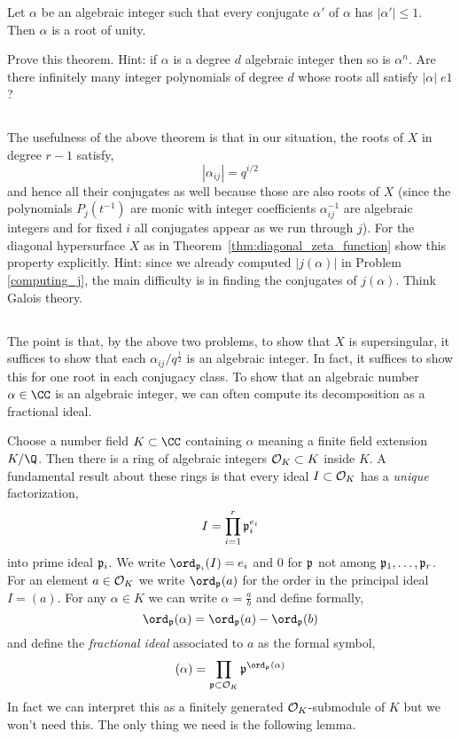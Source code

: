 \documentclass[12pt]{article}
\begin{document}
\begin{theorem}
Let $\alpha$ be an algebraic integer such that every conjugate $\alpha'$ of $\alpha$ has $|\alpha'| \le 1$. Then $\alpha$ is a root of unity.
\end{theorem}

Prove this theorem. Hint: if $\alpha$ is a degree $d$ algebraic integer then so is $\alpha^n$. Are there infinitely many integer polynomials of degree $d$ whose roots all satisfy $|\alpha| \;e 1$?

\subsection{}

The usefulness of the above theorem is that in our situation, the roots of $X$ in degree $r-1$ satisfy,
\[ |\alpha_{ij}| = q^{i/2} \]
and hence all their conjugates as well because those are also roots of $X$ (since the polynomials $P_j(t^{-1})$ are monic with integer coefficients $\alpha_{ij}^{-1}$ are algebraic integers and for fixed $i$ all conjugates appear as we run through $j$). For the diagonal hypersurface $X$ as in Theorem~\ref{thm:diagonal_zeta_function} show this property explicitly. Hint: since we already computed $|j(\alpha)|$ in Problem \ref{computing_j}, the main difficulty is in finding the conjugates of $j(\alpha)$. Think Galois theory. 

\subsection{}

The point is that, by the above two problems, to show that $X$ is supersingular, it suffices to show that each $\alpha_{ij} / q^{\frac{i}{2}}$ is an algebraic integer. In fact, it suffices to show this for one root in each conjugacy class. To show that an algebraic number $\alpha \in \CC$ is an algebraic integer, we can often compute its decomposition as a fractional ideal. 
\par
Choose a number field $K \subset \CC$ containing $\alpha$ meaning a finite field extension $K / \Q$. Then there is a ring of algebraic integers $\mathcal{O}_{K} \subset K$ inside $K$. A fundamental result about these rings is that every ideal $I \subset \mathcal{O}_{K}$ has a \textit{unique} factorization,
\[ I = \prod_{i = 1}^r \mathfrak{p}_i^{e_i} \]
into prime ideal $\mathfrak{p}_i$. We write $\ord_{\p_i}(I) = e_i$ and $0$ for $\mathfrak{p}$ not among $\mathfrak{p}_1, \dots, \mathfrak{p}_r$. For an element $a \in \mathcal{O}_{K}$ we write $\ord_{\p}(a)$ for the order in the principal ideal $I = (a)$. For any $\alpha \in K$ we can write $\alpha = \frac{a}{b}$ and define formally,
\[ \ord_{\p}(\alpha) = \ord_{\p}(a) - \ord_{\p}(b) \]
and define the \textit{fractional ideal} associated to $a$ as the formal symbol,
\[ (\alpha) = \prod_{\p \subset \struct{K}} \p^{\ord_{\p}(\alpha)} \]
In fact we can interpret this as a finitely generated $\mathcal{O}_{K}$-submodule of $K$ but we won't need this. The only thing we need is the following lemma.
\end{document}
